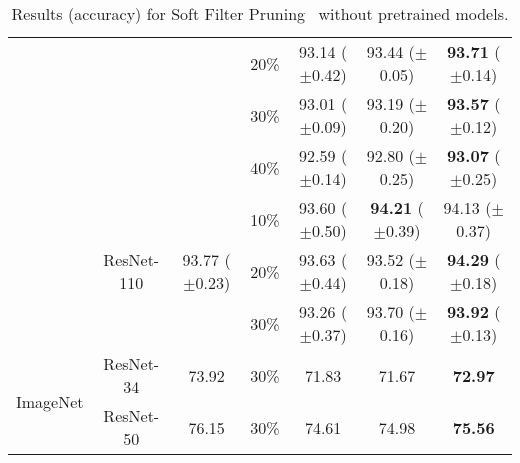\begin{table}[!htbp]
{\begin{tabular}{c|c|ccccc}
                           &                             & \multicolumn{1}{l}{} & 20\%        & 93.14 ($\pm$0.42) & 93.44 ($\pm$0.05) & \textbf{93.71} ($\pm$0.14) \\
                           &                             & \multicolumn{1}{l}{} & 30\%        & 93.01 ($\pm$0.09) & 93.19 ($\pm$0.20) & \textbf{93.57} ($\pm$0.12) \\
                           &                             & \multicolumn{1}{l}{} & 40\%        & 92.59 ($\pm$0.14) & 92.80 ($\pm$0.25) & \textbf{93.07} ($\pm$0.25) \\ \cline{2-7} 
                           & \multirow{3}{*}{ResNet-110} & \multirow{3}{*}{93.77 ($\pm$0.23)}  & 10\%        & 93.60 ($\pm$0.50) & \textbf{94.21} ($\pm$0.39) & 94.13 ($\pm$0.37) \\
                           &                             & \multicolumn{1}{l}{} & 20\%        & 93.63 ($\pm$0.44) & 93.52 ($\pm$0.18) & \textbf{94.29} ($\pm$0.18) \\
                           &                             & \multicolumn{1}{l}{} & 30\%        & 93.26 ($\pm$0.37) & 93.70 ($\pm$0.16) & \textbf{93.92} ($\pm$0.13) \\ \hline
\multirow{2}{*}{ImageNet}  & ResNet-34                   & 73.92                & 30\%        & 71.83       & 71.67       & \textbf{72.97}       \\ \cline{2-7} 
                           & ResNet-50                   & 76.15                & 30\%        & 74.61       & 74.98       & \textbf{75.56}       \\ \hline
\end{tabular}
}
\caption{Results (accuracy) for Soft Filter Pruning~\cite{he2018sfp} without pretrained models.}
\label{sfp-1}
\end{table}

\setlength{\tabcolsep}{4pt}
\renewcommand{\arraystretch}{1.25}
\begin{table}[!htbp]
\centering
\small
{}
\caption{Results (accuracy) for Soft Filter Pruning~\cite{he2018sfp} using pretrained models.}
\label{sfp-2}
\end{table}




